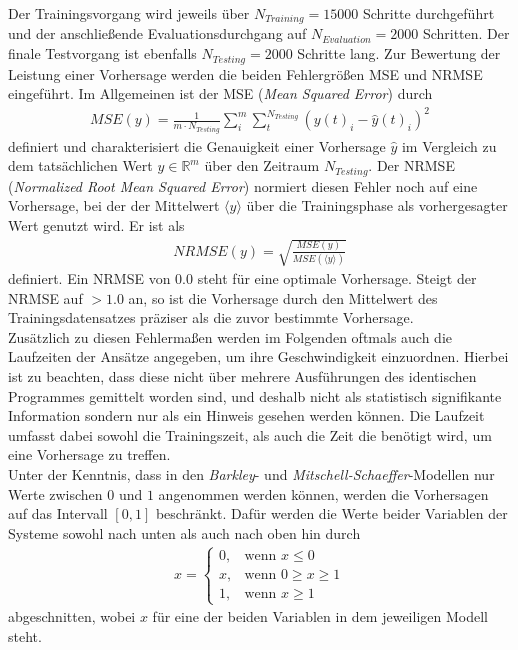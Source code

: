 Der Trainingsvorgang wird jeweils über $N_{Training}=15000$ Schritte durchgeführt und der anschließende Evaluationsdurchgang auf $N_{Evaluation} = 2000$ Schritten. Der finale Testvorgang ist ebenfalls $N_{Testing}=2000$ Schritte lang.
Zur Bewertung der Leistung einer Vorhersage werden die beiden Fehlergrößen MSE und NRMSE eingeführt. Im Allgemeinen ist der MSE (\textit{Mean Squared Error}) durch
\begin{align}
MSE(y) = \frac{1}{m \cdot N_{Testing}} \sum_i^m \sum_t^{N_{Testing}} \left(y(t)_i - \hat{y}(t)_i \right)^2
\end{align}
definiert und charakterisiert die Genauigkeit einer Vorhersage $\hat{y}$ im Vergleich zu dem tatsächlichen Wert $y \in \mathbb{R}^m$ über den Zeitraum $N_{Testing}$. Der NRMSE (\textit{Normalized Root Mean Squared Error}) normiert diesen Fehler noch auf eine Vorhersage, bei der der Mittelwert $\langle y \rangle$ über die Trainingsphase als vorhergesagter Wert genutzt wird. Er ist als
\begin{align}
NRMSE(y) = \sqrt{\frac{MSE(y)}{MSE\left(\langle y \rangle\right)}}
\end{align}
definiert. Ein NRMSE von $0.0$ steht für eine optimale Vorhersage. Steigt der NRMSE auf $>1.0$ an, so ist die Vorhersage durch den Mittelwert des Trainingsdatensatzes präziser als die zuvor bestimmte Vorhersage.\\
Zusätzlich zu diesen Fehlermaßen werden im Folgenden oftmals auch die Laufzeiten der Ansätze angegeben, um ihre Geschwindigkeit einzuordnen. Hierbei ist zu beachten, dass diese nicht über mehrere Ausführungen des identischen Programmes gemittelt worden sind, und deshalb nicht als statistisch signifikante Information sondern nur als ein Hinweis gesehen werden können. Die Laufzeit umfasst dabei sowohl die Trainingszeit, als auch die Zeit die benötigt wird, um eine Vorhersage zu treffen.\\

Unter der Kenntnis, dass in den \textit{Barkley}- und \textit{Mitschell-Schaeffer}-Modellen nur Werte zwischen $0$ und $1$ angenommen werden können, werden die Vorhersagen auf das Intervall $[0, 1]$ beschränkt. Dafür werden die Werte beider Variablen der Systeme sowohl nach unten als auch nach oben hin durch 
\begin{align}
x = \begin{cases}
	0,& \text{wenn } x \leq 0\\
	x,& \text{wenn } 0 \geq x \geq1\\
    1,& \text{wenn } x \geq 1
\end{cases}
\end{align}
abgeschnitten, wobei $x$ für eine der beiden Variablen in dem jeweiligen Modell steht.\\

